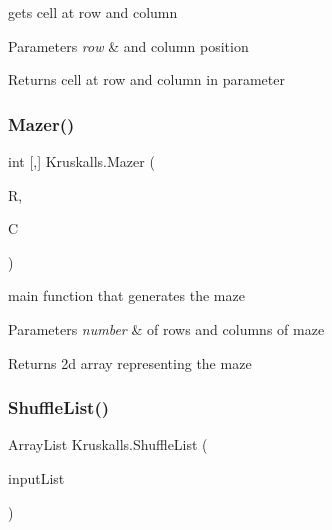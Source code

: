 gets cell at row and column 


\begin{DoxyParams}{Parameters}
{\em row} & and column position\\
\hline
\end{DoxyParams}
\begin{DoxyReturn}{Returns}
cell at row and column in parameter 
\end{DoxyReturn}
\mbox{\label{class_kruskalls_a42db33ed4989df473f51b8bea3df80c9}} 
\subsubsection{\texorpdfstring{Mazer()}{Mazer()}}
{\footnotesize\ttfamily int \mbox{[},\mbox{]} Kruskalls.\+Mazer (\begin{DoxyParamCaption}\item[{int}]{R,  }\item[{int}]{C }\end{DoxyParamCaption})}



main function that generates the maze 


\begin{DoxyParams}{Parameters}
{\em number} & of rows and columns of maze\\
\hline
\end{DoxyParams}
\begin{DoxyReturn}{Returns}
2d array representing the maze 
\end{DoxyReturn}
\mbox{\label{class_kruskalls_a73b1ef65b42f134f6f69d394e487c7c5}} 
\subsubsection{\texorpdfstring{ShuffleList()}{ShuffleList()}}
{\footnotesize\ttfamily Array\+List Kruskalls.\+Shuffle\+List (\begin{DoxyParamCaption}\item[{Array\+List}]{input\+List }\end{DoxyParamCaption})\hspace{0.3cm}{\ttfamily [private]}}



